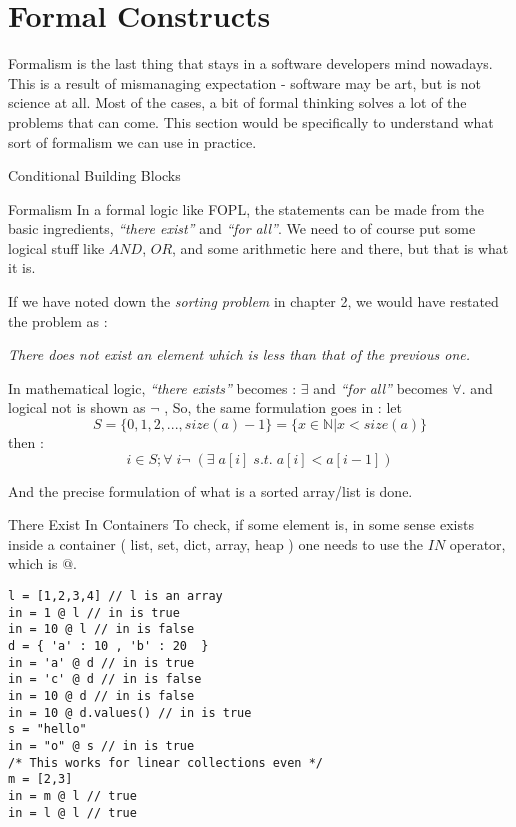 \chapter{Formal Constructs}\label{using-predicates}

{\LARGE F}ormalism is the last thing that stays in a software developers mind nowadays. This is a result of mismanaging expectation - software may be art, but is not science at all. Most of the cases, a bit of formal thinking solves a lot of the problems that can come.
This section would be specifically to understand what sort of formalism we can use in practice.

\begin{section}{Conditional Building Blocks}

\begin{subsection}{Formalism}
In a formal logic like FOPL, the statements can be made from the basic ingredients, 
\emph{``there exist''} and \emph{``for all''}. We need to of course put some logical stuff like $AND$, $OR$,
and some arithmetic here and there, but that is what it is.

If we have noted down the \emph{sorting problem} in chapter 2, we would have restated the problem as :

\begin{center}
\emph{ There does not exist an element which is less than that of the previous one. }
\end{center} 

In mathematical logic, \emph{``there exists''} becomes : $\exists$ and \emph{``for all''} becomes $\forall$.
and logical not is shown as $\neg$ ,  So, the same formulation goes in : let 
$$
S = \{ 0, 1, 2, ... , size(a)-1  \} =  \{  x \in \mathbb{N} | x < size(a) \} 
$$
then :
$$
  i \in S ; \forall \; i  \neg \; ( \exists \; a[i] \; s.t. \; a[i] < a[i-1]    ) 
$$ 

And the precise formulation of what is a sorted array/list is done.

\end{subsection}


\begin{subsection}{There Exist In Containers}
To check, if some element is, in some sense exists inside a container ( list, set, dict, array, heap )
one needs to use the $IN$ operator, which is $@$. 

\begin{center}\begin{minipage}{\linewidth}
\begin{lstlisting}[style=JexlStyle]
l = [1,2,3,4] // l is an array 
in = 1 @ l // in is true 
in = 10 @ l // in is false 
d = { 'a' : 10 , 'b' : 20  }
in = 'a' @ d // in is true 
in = 'c' @ d // in is false 
in = 10 @ d // in is false 
in = 10 @ d.values() // in is true 
s = "hello"
in = "o" @ s // in is true 
/* This works for linear collections even */
m = [2,3]
in = m @ l // true 
in = l @ l // true  
\end{lstlisting}
\end{minipage}\end{center}


\end{subsection}
\end{section}
